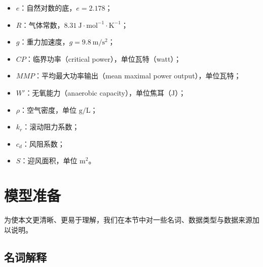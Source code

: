\documentclass[11pt,a4paper]{ctexart}
\begin{document}
\begin{itemize}
\item $e$：自然对数的底，$e=2.178$；
\item $R$：气体常数，$8.31\ \mathrm{J\cdot mol^{-1}\cdot K^{-1}}$；
\item $g$：重力加速度，$g=9.8\ \mathrm{m/s^{2}}$；
\item $CP$：临界功率（critical power），单位瓦特（watt）；
\item $MMP$：平均最大功率输出（mean maximal power output），单位瓦特；
\item $W'$：无氧能力（anaerobic capacity），单位焦耳（J）；
\item $\rho$：空气密度，单位 $\mathrm{g/L}$；
\item $k_r$：滚动阻力系数；
\item $c_d$：风阻系数；
\item $S$：迎风面积，单位 $\mathrm{m^{2}}$。
\end{itemize}

\section{模型准备}

为使本文更清晰、更易于理解，我们在本节中对一些名词、数据类型与数据来源加以说明。

\subsection{名词解释}
\end{document}
